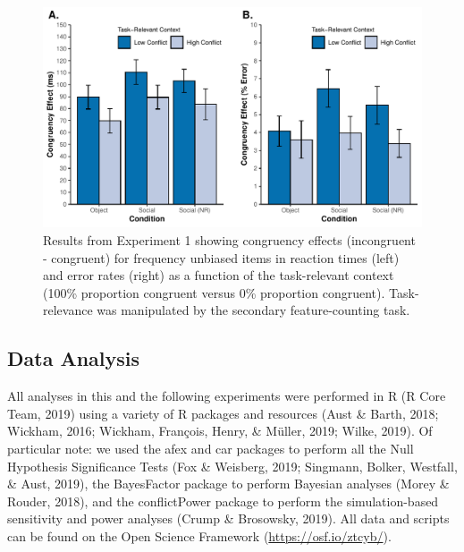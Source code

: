 \documentclass[english,,man,floatsintext]{apa6}
\begin{document}
\begin{figure}
\centering
\includegraphics{manuscript_files/figure-latex/figure2-1.pdf}
\caption{\label{fig:figure2}Results from Experiment 1 showing congruency effects (incongruent - congruent) for frequency unbiased items in reaction times (left) and error rates (right) as a function of the task-relevant context (100\% proportion congruent versus 0\% proportion congruent). Task-relevance was manipulated by the secondary feature-counting task.}
\end{figure}



\hypertarget{data-analysis}{%
\subsection{Data Analysis}\label{data-analysis}}

All analyses in this and the following experiments were performed in R (R Core Team, 2019) using a variety of R packages and resources (Aust \& Barth, 2018; Wickham, 2016; Wickham, François, Henry, \& Müller, 2019; Wilke, 2019). Of particular note: we used the afex and car packages to perform all the Null Hypothesis Significance Tests (Fox \& Weisberg, 2019; Singmann, Bolker, Westfall, \& Aust, 2019), the BayesFactor package to perform Bayesian analyses (Morey \& Rouder, 2018), and the conflictPower package to perform the simulation-based sensitivity and power analyses (Crump \& Brosowsky, 2019). All data and scripts can be found on the Open Science Framework (\url{https://osf.io/ztcyb/}).
\end{document}

